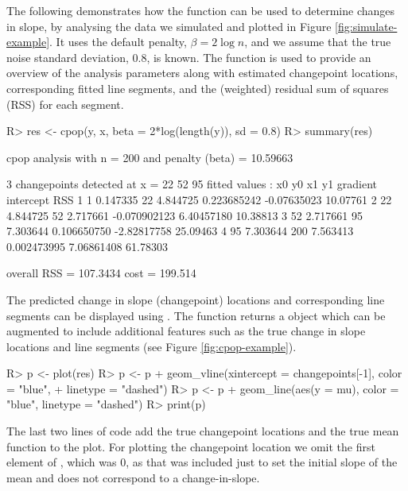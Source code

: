 \documentclass[article]{jss}
\begin{document}
%
%
The following demonstrates how the  function can be used to determine changes in slope, by analysing the data we simulated and plotted in Figure \ref{fig:simulate-example}. It uses the default penalty, $\beta=2\log n$, and we assume that the true noise standard deviation, 0.8, is known. The  function is used to provide an overview of the analysis parameters along with estimated changepoint locations, corresponding fitted line segments, and the (weighted) residual sum of squares (RSS) for each segment. 
%
%
\begin{CodeChunk}
\begin{CodeInput}
R> res <- cpop(y, x, beta = 2*log(length(y)), sd = 0.8)
R> summary(res)
\end{CodeInput}
\begin{CodeOutput}
cpop analysis with n = 200 and penalty (beta)  = 10.59663

3  changepoints detected at x = 
 22 52 95
fitted values : 
  x0       y0  x1       y1     gradient   intercept      RSS
1  1 0.147335  22 4.844725  0.223685242 -0.07635023 10.07761
2 22 4.844725  52 2.717661 -0.070902123  6.40457180 10.38813
3 52 2.717661  95 7.303644  0.106650750 -2.82817758 25.09463
4 95 7.303644 200 7.563413  0.002473995  7.06861408 61.78303

overall RSS = 107.3434
cost = 199.514
\end{CodeOutput}
\end{CodeChunk}
%
%
The predicted change in slope (changepoint) locations and corresponding line segments can be displayed using . The  function returns a  object which can be augmented to include additional features such as the true change in slope locations and line segments (see Figure \ref{fig:cpop-example}).
%
%
\begin{CodeChunk}
\begin{CodeInput}
R> p <- plot(res)
R> p <- p + geom_vline(xintercept = changepoints[-1], color = "blue",
+                   linetype = "dashed")
R> p <- p + geom_line(aes(y = mu), color = "blue", linetype = "dashed")
R> print(p)
\end{CodeInput}
\end{CodeChunk}
The last two lines of code add the true changepoint locations and the true mean function to the plot. For plotting the changepoint location we omit the first element of , which was 0, as that was included just to set the initial slope of the mean and does not correspond to a change-in-slope.
\end{document}
